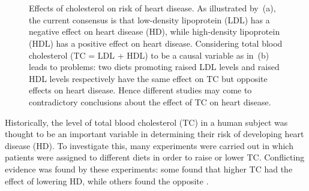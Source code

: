 \begin{figure}
	\begin{subfigure}{.45\linewidth}
		\center\
		\caption{}\label{fig:cholesterol:a}
	\end{subfigure}
	\hfill
	\begin{subfigure}{.45\linewidth}
		\center\
		\caption{}\label{fig:cholesterol:b}
	\end{subfigure}
	\caption{Effects of cholesterol on risk of heart disease. As illustrated by~(a), the current consensus is that low-density lipoprotein (LDL) has a negative effect on heart disease (HD), while high-density lipoprotein (HDL) has a positive effect on heart disease. Considering total blood cholesterol (TC = LDL + HDL) to be a causal variable as in~(b) leads to problems: two diets promoting raised LDL levels and raised HDL levels respectively have the same effect on TC but opposite effects on heart disease. Hence different studies may come to contradictory conclusions about the effect of TC on heart disease.}
	\label{fig:cholesterol}
\end{figure}




Historically, the level of total blood cholesterol (TC) in a human subject was thought to be an important variable in determining their risk of developing heart disease (HD).
To investigate this, many experiments were carried out in which patients were assigned to different diets in order to raise or lower TC\@.
Conflicting evidence was found by these experiments: some found that higher TC had the effect of lowering HD, while others found the opposite \citep{truswell2010cholesterol,steinberg2011cholesterol}.

